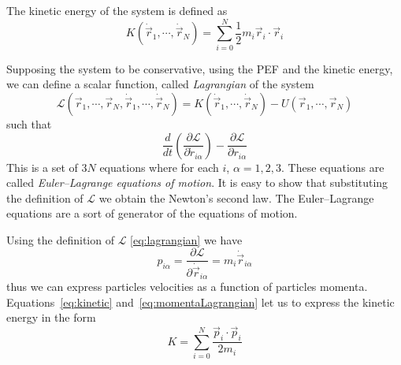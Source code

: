 The kinetic energy of the system is defined as
\begin{equation}
	K(\dot{\vec r}_1,\cdots,\dot{\vec r}_N) = \sum_{i=0}^N\frac{1}{2}m_i\vec r_i \cdot \vec r_i
	\label{eq:kinetic}
\end{equation}

Supposing the system to be conservative, using the \ac{PEF} and the kinetic energy, we can define a scalar
function, called \textit{Lagrangian} of the system
\begin{equation}
	\mathcal{L}(\vec r_1, \cdots, \vec r_N, \dot{\vec r}_1,\cdots,\dot{\vec r}_N) = K(\dot{\vec r}_1,\cdots,\dot{\vec r}_N) - U(\vec r_1, \cdots, \vec r_N)
	\label{eq:lagrangian}
\end{equation}
such that
\begin{equation}
	\frac{d}{dt}\left ( \frac{\partial \mathcal{L}}{\partial \dot r_{i\alpha}}\right ) - \frac{\partial\mathcal{L}}{\partial r_{i\alpha}}
	\label{eq:EulerLagrange}
\end{equation}
This is a set of $3N$ equations where for each $i$, $\alpha=1,2,3$. These equations are called
\textit{Euler--Lagrange equations of motion}. It is easy to show that substituting the definition of $\mathcal{L}$
we obtain the Newton's second law. The Euler--Lagrange equations are a sort of generator of the equations of motion.

Using the definition of $\mathcal{L}$ \eqref{eq:lagrangian} we have
\begin{equation}
	p_{i\alpha} = \frac{\partial\mathcal{L}}{\partial \dot{\vec r}_{i\alpha}} = m_i\dot{\vec r}_{i\alpha}
	\label{eq:momentaLagrangian}
\end{equation}
thus we can express particles velocities as a function of particles momenta. Equations~\eqref{eq:kinetic}
and~\eqref{eq:momentaLagrangian} let us to express the kinetic energy in the form
\begin{equation}
	K = \sum_{i=0}^N \frac{\vec p_i \cdot \vec p_i}{2m_i}
	\label{eq:kineticP}
\end{equation}

